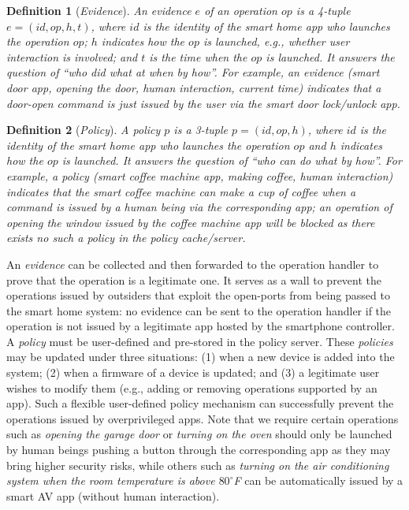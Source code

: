 \documentclass[letterpaper,12pt]{article}
\newtheorem{definition}{Definition}
\begin{document}
\begin{definition}[\textit{Evidence}]\label{def:evidence}
An \textit{evidence} $e$ of an operation $op$ is a 4-tuple $e=(id, op, h, t)$, where $id$ is the identity of the smart home app who launches the operation $op$; $h$ indicates how the $op$ is launched, e.g., whether user interaction is involved; and $t$ is the time when the $op$ is launched. It answers the question of ``\textit{who did what at when by how}''. For example, an evidence \emph{(smart door app, opening the door, human interaction, current time)} indicates that a door-open command is just issued by the user via the smart door lock/unlock app. 
\end{definition}

\begin{definition}[\textit{Policy}]\label{def:policy}
A \textit{policy} $p$ is a 3-tuple $p =(id, op, h)$, where $id$ is the identity of the smart home app who launches the operation $op$ and $h$ indicates how the $op$ is launched. It answers the question of ``\emph{who can do what by how}''. For example, a policy \emph{(smart coffee machine app, making coffee, human interaction)} indicates that the smart coffee machine can make a cup of coffee when a command is issued by a human being via the corresponding app; an operation of opening the window  issued by the coffee machine app will be blocked as there exists no such a policy in the policy cache/server.
\end{definition}

An \textit{evidence} can be collected and then forwarded to the operation handler to prove that the operation is a legitimate one. It serves as a wall to prevent the operations issued by outsiders that exploit the open-ports from being passed to the smart home system: no evidence can be sent to the operation handler if the operation is not issued by a legitimate app hosted by the smartphone controller.
A \textit{policy} must be user-defined and pre-stored in the policy server. These \textit{policies} may be updated under three situations: (1) when a new device is added into the system; (2) when a firmware of a device is updated; and (3) a legitimate user wishes to modify them (e.g., adding or removing operations supported by an app). Such a flexible user-defined policy mechanism can successfully prevent the operations issued by overprivileged apps. Note that we require certain operations such as \emph{opening the garage door} or \emph{turning on the oven} should only be launched by human beings pushing a button through the corresponding app as they may bring higher security risks, while others such as \emph{turning on the air conditioning system when the room temperature is above $80^\circ$F} can be automatically issued by a smart AV app (without human interaction). 
\end{document}
